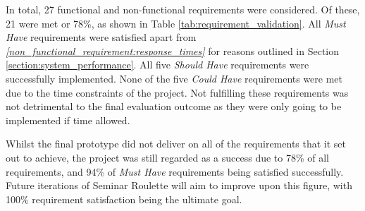 \documentclass{l4proj}
\begin{document}
In total, 27 functional and non-functional requirements were considered. Of these, 21 were met or 78\%, as shown in Table \ref{tab:requirement_validation}. All \emph{Must Have} requirements were satisfied apart from \emph{\ref{non_functional_requirement:response_times}} for reasons outlined in Section \ref{section:system_performance}. All five \emph{Should Have} requirements were successfully implemented. None of the five \emph{Could Have} requirements were met due to the time constraints of the project. Not fulfilling these requirements was not detrimental to the final evaluation outcome as they were only going to be implemented if time allowed.

Whilst the final prototype did not deliver on all of the requirements that it set out to achieve, the project was still regarded as a success due to 78\% of all requirements, and 94\% of \emph{Must Have} requirements being satisfied successfully. Future iterations of Seminar Roulette will aim to improve upon this figure, with 100\% requirement satisfaction being the ultimate goal.
\end{document}
